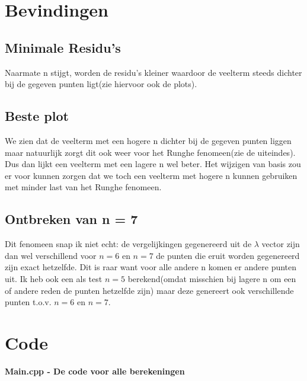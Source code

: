 \documentclass[10pt,a4paper]{article}
\begin{document}
\section{Bevindingen}
\subsection{Minimale Residu's}
Naarmate n stijgt, worden de residu's kleiner waardoor de veelterm steeds dichter bij de gegeven punten ligt(zie hiervoor ook de plots).
\subsection{Beste plot}
We zien dat de veelterm met een hogere n dichter bij de gegeven punten liggen maar natuurlijk zorgt dit ook weer voor het Runghe fenomeen(zie de uiteindes). Dus dan lijkt een veelterm met een lagere n wel beter. Het wijzigen van basis zou er voor kunnen zorgen dat we toch een veelterm met hogere n kunnen gebruiken met minder last van het Runghe fenomeen.
\subsection{Ontbreken van n = 7}
Dit fenomeen snap ik niet echt: de vergelijkingen gegenereerd uit de $\lambda$ vector zijn dan wel verschillend voor $n = 6$ en $n = 7$ de punten die eruit worden gegenereerd zijn exact hetzelfde. Dit is raar want voor alle andere n komen er andere punten uit. Ik heb ook een als test $n = 5$ berekend(omdat misschien bij lagere n om een of andere reden de punten hetzelfde zijn) maar deze genereert ook verschillende punten t.o.v. $n = 6$ en $n = 7$.
\section{Code}
\textbf{Main.cpp - De code voor alle berekeningen}

\end{document}
